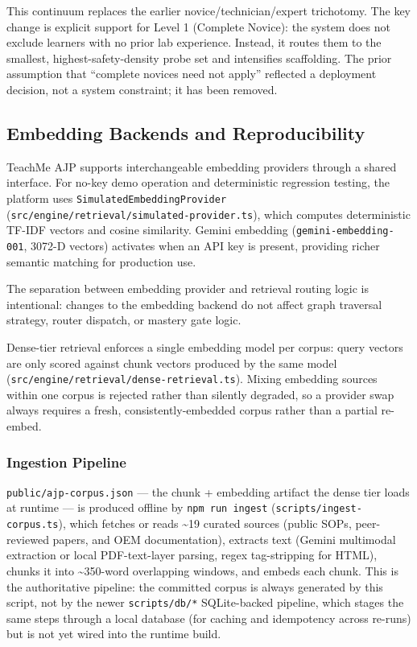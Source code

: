 \documentclass[11pt,letterpaper]{article}
\newcommand{\code}[1]{\texttt{\small #1}}
\begin{document}
This continuum replaces the earlier novice/technician/expert trichotomy. The key change is explicit support for Level 1 (Complete Novice): the system does not exclude learners with no prior lab experience. Instead, it routes them to the smallest, highest-safety-density probe set and intensifies scaffolding. The prior assumption that ``complete novices need not apply'' reflected a deployment decision, not a system constraint; it has been removed.

\subsection{Embedding Backends and Reproducibility}
\label{sec:embedding-backends}

TeachMe AJP supports interchangeable embedding providers through a shared interface. For no-key demo operation and deterministic regression testing, the platform uses \code{SimulatedEmbeddingProvider} (\code{src/\linebreak[0]engine/\linebreak[0]retrieval/\linebreak[0]simulated-provider.ts}), which computes deterministic TF-IDF vectors and cosine similarity. Gemini embedding (\code{gemini-embedding-001}, 3072-D vectors) activates when an API key is present, providing richer semantic matching for production use.

The separation between embedding provider and retrieval routing logic is intentional: changes to the embedding backend do not affect graph traversal strategy, router dispatch, or mastery gate logic.

Dense-tier retrieval enforces a single embedding model per corpus: query vectors are only scored against chunk vectors produced by the same model (\code{src/\linebreak[0]engine/\linebreak[0]retrieval/\linebreak[0]dense-retrieval.ts}). Mixing embedding sources within one corpus is rejected rather than silently degraded, so a provider swap always requires a fresh, consistently-embedded corpus rather than a partial re-embed.

\subsubsection{Ingestion Pipeline}
\label{sec:ingestion-pipeline}

\code{public/ajp-corpus.json} --- the chunk + embedding artifact the dense tier loads at runtime --- is produced offline by \code{npm run ingest} (\code{scripts/ingest-corpus.ts}), which fetches or reads \textasciitilde19 curated sources (public SOPs, peer-reviewed papers, and OEM documentation), extracts text (Gemini multimodal extraction or local PDF-text-layer parsing, regex tag-stripping for HTML), chunks it into \textasciitilde350-word overlapping windows, and embeds each chunk. This is the authoritative pipeline: the committed corpus is always generated by this script, not by the newer \code{scripts/db/*} SQLite-backed pipeline, which stages the same steps through a local database (for caching and idempotency across re-runs) but is not yet wired into the runtime build.
\end{document}
